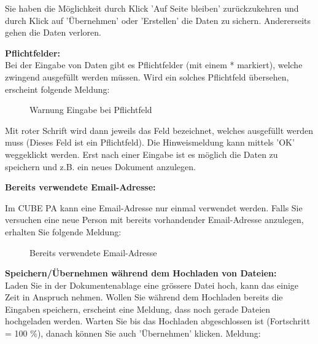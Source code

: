 Sie haben die Möglichkeit durch Klick 'Auf Seite bleiben' zurückzukehren und durch Klick auf 'Übernehmen' oder 'Erstellen' die Daten zu sichern. Andererseits gehen die Daten verloren.

\vspace{\baselineskip}

\textbf{Pflichtfelder:}\\
Bei der Eingabe von Daten gibt es Pflichtfelder (mit einem * markiert), welche zwingend ausgefüllt werden müssen. Wird ein solches Pflichtfeld übersehen, erscheint folgende Meldung:

\begin{figure}[H]
\caption{Warnung Eingabe bei Pflichtfeld}
\end{figure}

Mit roter Schrift wird dann jeweils das Feld bezeichnet, welches ausgefüllt werden muss (Dieses Feld ist ein Pflichtfeld). Die Hinweismeldung kann mittels 'OK' weggeklickt werden. Erst nach einer Eingabe ist es möglich die Daten zu speichern und z.B. ein neues Dokument anzulegen. 

\pagebreak
\textbf{Bereits verwendete Email-Adresse:}

Im CUBE PA kann eine Email-Adresse nur einmal verwendet werden. Falls Sie versuchen eine neue Person mit bereits vorhandender Email-Adresse anzulegen, erhalten Sie folgende Meldung:

\begin{figure}[H]
\caption{Bereits verwendete Email-Adresse}
\end{figure}

\vspace{\baselineskip}

\textbf{Speichern/Übernehmen während dem Hochladen von Dateien:}\\
Laden Sie in der Dokumentenablage eine grössere Datei hoch, kann das einige Zeit in Anspruch nehmen. Wollen Sie während dem Hochladen bereits die Eingaben speichern, erscheint eine Meldung, dass noch gerade Dateien hochgeladen werden. Warten Sie bis das Hochladen abgeschlossen ist (Fortschritt = 100 \%), danach können Sie auch 'Übernehmen' klicken. Meldung:

